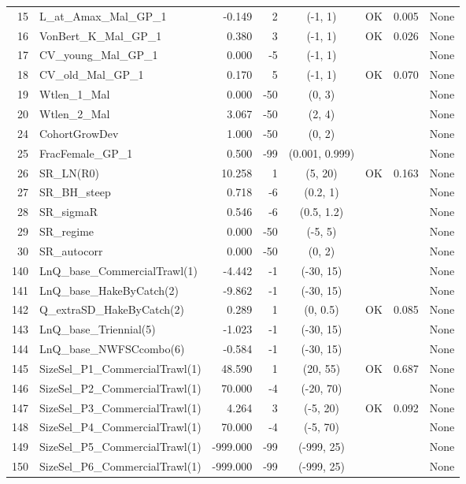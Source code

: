 \documentclass[12pt,]{article}
\begin{document}
\begin{landscape}
\begin{longtable}{rlrrcccl}
  15 & L\_at\_Amax\_Mal\_GP\_1 & -0.149 & 2 & (-1, 1) & OK & 0.005 & None \\ 
  16 & VonBert\_K\_Mal\_GP\_1 & 0.380 & 3 & (-1, 1) & OK & 0.026 & None \\ 
  17 & CV\_young\_Mal\_GP\_1 & 0.000 & -5 & (-1, 1) &  &  & None \\ 
  18 & CV\_old\_Mal\_GP\_1 & 0.170 & 5 & (-1, 1) & OK & 0.070 & None \\ 
  19 & Wtlen\_1\_Mal & 0.000 & -50 & (0, 3) &  &  & None \\ 
  20 & Wtlen\_2\_Mal & 3.067 & -50 & (2, 4) &  &  & None \\ 
  24 & CohortGrowDev & 1.000 & -50 & (0, 2) &  &  & None \\ 
  25 & FracFemale\_GP\_1 & 0.500 & -99 & (0.001, 0.999) &  &  & None \\ 
  26 & SR\_LN(R0) & 10.258 & 1 & (5, 20) & OK & 0.163 & None \\ 
  27 & SR\_BH\_steep & 0.718 & -6 & (0.2, 1) &  &  & None \\ 
  28 & SR\_sigmaR & 0.546 & -6 & (0.5, 1.2) &  &  & None \\ 
  29 & SR\_regime & 0.000 & -50 & (-5, 5) &  &  & None \\ 
  30 & SR\_autocorr & 0.000 & -50 & (0, 2) &  &  & None \\ 
  140 & LnQ\_base\_CommercialTrawl(1) & -4.442 & -1 & (-30, 15) &  &  & None \\ 
  141 & LnQ\_base\_HakeByCatch(2) & -9.862 & -1 & (-30, 15) &  &  & None \\ 
  142 & Q\_extraSD\_HakeByCatch(2) & 0.289 & 1 & (0, 0.5) & OK & 0.085 & None \\ 
  143 & LnQ\_base\_Triennial(5) & -1.023 & -1 & (-30, 15) &  &  & None \\ 
  144 & LnQ\_base\_NWFSCcombo(6) & -0.584 & -1 & (-30, 15) &  &  & None \\ 
  145 & SizeSel\_P1\_CommercialTrawl(1) & 48.590 & 1 & (20, 55) & OK & 0.687 & None \\ 
  146 & SizeSel\_P2\_CommercialTrawl(1) & 70.000 & -4 & (-20, 70) &  &  & None \\ 
  147 & SizeSel\_P3\_CommercialTrawl(1) & 4.264 & 3 & (-5, 20) & OK & 0.092 & None \\ 
  148 & SizeSel\_P4\_CommercialTrawl(1) & 70.000 & -4 & (-5, 70) &  &  & None \\ 
  149 & SizeSel\_P5\_CommercialTrawl(1) & -999.000 & -99 & (-999, 25) &  &  & None \\ 
  150 & SizeSel\_P6\_CommercialTrawl(1) & -999.000 & -99 & (-999, 25) &  &  & None \\ 

\end{longtable}
\end{landscape}
\end{document}
